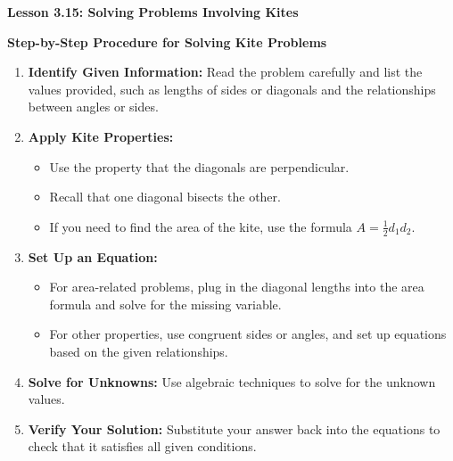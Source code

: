 \begin{center}
\textbf{Lesson 3.15: Solving Problems Involving Kites}
\end{center}

\vspace*{-1.5ex}


\noindent\textbf{Step-by-Step Procedure for Solving Kite Problems}

\begin{enumerate}[label=\color{blue}\arabic*.]
    \item \textbf{Identify Given Information:} Read the problem carefully and list the values provided, such as lengths of sides or diagonals and the relationships between angles or sides.
    \item \textbf{Apply Kite Properties:} 
    \begin{itemize}
        \item Use the property that the diagonals are perpendicular.
        \item Recall that one diagonal bisects the other.
        \item If you need to find the area of the kite, use the formula \(A = \frac{1}{2} d_1 d_2\).
    \end{itemize}
    \item \textbf{Set Up an Equation:} 
    \begin{itemize}
        \item For area-related problems, plug in the diagonal lengths into the area formula and solve for the missing variable.
        \item For other properties, use congruent sides or angles, and set up equations based on the given relationships.
    \end{itemize}
    \item \textbf{Solve for Unknowns:} Use algebraic techniques to solve for the unknown values.
    \item \textbf{Verify Your Solution:} Substitute your answer back into the equations to check that it satisfies all given conditions.
\end{enumerate}
